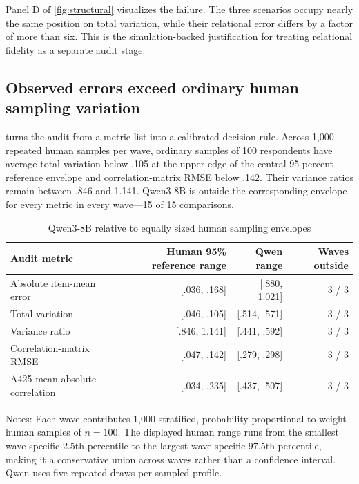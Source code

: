 \documentclass[10pt,twocolumn]{article}
\begin{document}
Panel D of \cref{fig:structural} visualizes the failure. The three scenarios occupy nearly the same
position on total variation, while their relational error differs by a factor of more than six.
This is the simulation-backed justification for treating relational fidelity as a separate audit
stage.

\subsection{Observed errors exceed ordinary human sampling variation}

 turns the audit from a metric list into a calibrated decision rule.
Across 1,000 repeated human samples per wave, ordinary samples of 100 respondents have average total
variation below .105 at the upper edge of the central 95 percent reference envelope and
correlation-matrix RMSE below .142. Their variance ratios remain between .846 and 1.141. Qwen3-8B is
outside the corresponding envelope for every metric in every wave---15 of 15 comparisons.

\begin{table}[!htbp]
\centering
\caption{Qwen3-8B relative to equally sized human sampling envelopes}
\label{tab:sampling-envelope}
\begin{threeparttable}
\small
\begin{tabularx}{\textwidth}{Yrrr}
\toprule
Audit metric & Human 95\% reference range & Qwen range & Waves outside \\
\midrule
Absolute item-mean error & [.036, .168] & [.880, 1.021] & 3 / 3 \\
Total variation & [.046, .105] & [.514, .571] & 3 / 3 \\
Variance ratio & [.846, 1.141] & [.441, .592] & 3 / 3 \\
Correlation-matrix RMSE & [.047, .142] & [.279, .298] & 3 / 3 \\
A425 mean absolute correlation & [.034, .235] & [.437, .507] & 3 / 3 \\
\bottomrule
\end{tabularx}
\begin{tablenotes}[flushleft]
\footnotesize
\item Notes: Each wave contributes 1,000 stratified, probability-proportional-to-weight human
samples of $n=100$. The displayed human range runs from the smallest wave-specific 2.5th percentile
to the largest wave-specific 97.5th percentile, making it a conservative union across waves rather
than a confidence interval. Qwen uses five repeated draws per sampled profile.
\end{tablenotes}
\end{threeparttable}
\end{table}
\end{document}
